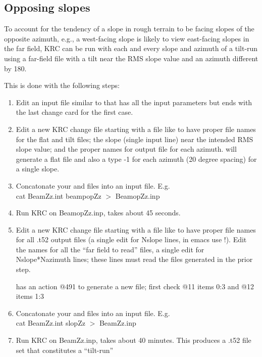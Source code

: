 \documentclass{article}
\begin{document}
\subsection{Opposing slopes}
 To account for the tendency of a slope in rough terrain to be facing slopes of
 the opposite azimuth, e.g., a west-facing slope  is likely to view
 east-facing slopes in the far field, KRC can be run with each and every
 slope and azimuth of a tilt-run using a far-field file with a tilt near the RMS
 slope value and an azimuth different by 180\qd.

This is done with the following steps: \begin{enumerate} %

\item Edit an input file similar to  that has all the input
  parameters but ends with the last change card for the first case.

\item Edit a new KRC change file starting with a file like  to have proper file
  names for the flat and tilt files; the slope (single input line) near the
  intended RMS slope value; and the proper names for output file for each
  azimuth.   will generate a flat file and also a type -1 for
  each azimuth (20 degree spacing) for a single slope.

\item Concatonate your  and  files into an input file. E.g.
  \\ cat BeamZz.int beampopZz $>$ BeamopZz.inp

\item Run KRC on BeamopZz.inp, takes about 45 seconds.

\item Edit a new KRC change file starting with a file like  to have
  proper file names for all .t52 output files (a single edit for Nslope lines,
  in emacs use !). Edit the names for all the ``far field to read'' files, a
  single edit for Nslope*Nazimuth lines; these lines must read the files
  generated in the prior step.

 has an action @491 to generate a new  file; first
check @11  items 0:3 and @12  items 1:3 

\item Concatonate your  and  files into an input
  file. E.g.  \\ cat BeamZz.int slopZz $>$ BeamZz.inp

\item  Run  KRC on BeamZz.inp, takes about 40 minutes. This produces a .t52 file set that constitutes a ``tilt-run''  

\end{enumerate} 
\end{document}
